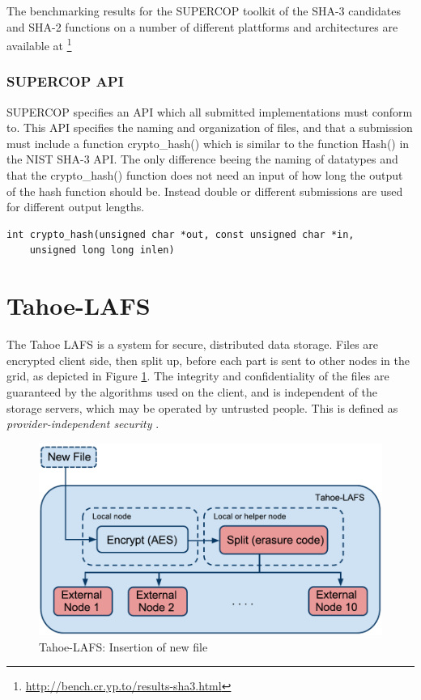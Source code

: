 \documentclass[english,12pt,a4paper]{book}
\begin{document}
The benchmarking results for the \ac{SUPERCOP} toolkit of the \ac{SHA}-3
candidates and \ac{SHA}-2 functions on a number of different plattforms and
architectures are available at
\footnote{\url{http://bench.cr.yp.to/results-sha3.html}}

\subsubsection{\ac{SUPERCOP} \ac{API}}
\ac{SUPERCOP} specifies an \ac{API} which all submitted implementations must
conform to\cite{s_supercopapi}. This \ac{API} specifies the naming and
organization of files, and that a submission must include a function
crypto\_hash() which is similar to the function Hash() in the \ac{NIST} \ac{SHA}-3
\ac{API}. The only difference beeing the naming of datatypes and that the
crypto\_hash() function does not need an input of how long the output of the
hash function should be. Instead double or different submissions are used for
different output lengths.

\begin{verbatim}
int crypto_hash(unsigned char *out, const unsigned char *in,
    unsigned long long inlen)
\end{verbatim}

\section{Tahoe-LAFS}

The Tahoe \ac{LAFS} is a system for secure,
distributed data storage. Files are encrypted client side, then
split up, before each part is sent to other nodes in the grid, as depicted in
Figure \ref{fig:tahoeinsertion}. The integrity and confidentiality of the files
are guaranteed by the algorithms used on the client, and is independent of the
storage servers, which may be operated by untrusted people. This is defined as
\emph{provider-independent security} \cite{t_tahoe}.

\begin{figure}[h!]
    \centering
    \includegraphics[width=0.9\columnwidth]{Tahoe-newfile.pdf}
    \caption{Tahoe-LAFS: Insertion of new file}
    \label{fig:tahoeinsertion}
\end{figure}
\end{document}
